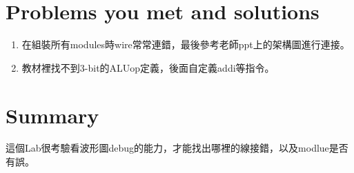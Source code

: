 \documentclass[12pt,a4paper]{article}
\theoremstyle{definition}
\begin{document}
\section{Problems you met and solutions}

\begin{enumerate}
\item 在組裝所有modules時wire常常連錯，最後參考老師ppt上的架構圖進行連接。
\item 教材裡找不到3-bit的ALUop定義，後面自定義addi等指令。
\end{enumerate}

\section{Summary}

這個Lab很考驗看波形圖debug的能力，才能找出哪裡的線接錯，以及modlue是否有誤。


\end{document}
